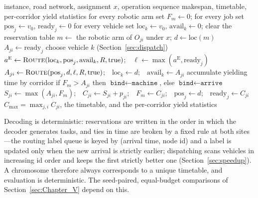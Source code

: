 \documentclass[manuscript,screen,review]{acmart}
\begin{document}
\begin{algorithm}[t]
\caption{\textsc{Decode}: fitness from a complete conflict-free simulation}
\label{alg:decode}
\small
\begin{algorithmic}[1]
\Require instance, road network, assignment $x$, operation sequence
\Ensure makespan, timetable, per-corridor yield statistics
\State for every robotic arm set $F_m\gets 0$; for every job set $\mathrm{pos}_j\gets v_0$,
       $\mathrm{ready}_j\gets 0$
\State for every vehicle set $\mathrm{loc}_k\gets v_0$, $\mathrm{avail}_k\gets 0$; clear the reservation table
  \State $m\gets$ the robotic arm of $O_{ji}$ under $x$; $d\gets \mathrm{loc}(m)$
     \State $A_{ji}\gets \mathrm{ready}_j$ 
  \Else
     \State choose vehicle $k$ (Section~\ref{sec:dispatch})
     \State $a^{\mathrm{E}}\gets\textsc{Route}(\mathrm{loc}_k,\mathrm{pos}_j,
            \mathrm{avail}_k,R,\text{true})$;\ \ $\ell\gets\max(a^{\mathrm{E}},
            \mathrm{ready}_j)$ 
     \State $A_{ji}\gets\textsc{Route}(\mathrm{pos}_j,d,\ell,R,\text{true})$;\ \
            $\mathrm{loc}_k\gets d$;\ \ $\mathrm{avail}_k\gets A_{ji}$
     \State accumulate yielding time by corridor
  \EndIf
  \State if $F_m>A_{ji}$ then $\texttt{bind}\gets\texttt{machine}$, else
         $\texttt{bind}\gets\texttt{arrive}$ 
  \State $S_{ji}\gets\max(A_{ji},F_m)$;\ \ $C_{ji}\gets S_{ji}+p_{ji}$;\ \
         $F_m\gets C_{ji}$;\ \ $\mathrm{pos}_j\gets d$;\ \
         $\mathrm{ready}_j\gets C_{ji}$
\EndFor
\State \Return $C_{\max}=\max_{j,i} C_{ji}$, the timetable, and the per-corridor yield statistics
\end{algorithmic}
\end{algorithm}

Decoding is deterministic: reservations are written in the order in which the decoder generates tasks, and ties in time are broken by a fixed rule at both sites---the routing label queue is keyed by (arrival time, node id) and a label is updated only when the new arrival is strictly earlier;
dispatching scans vehicles in increasing id order and keeps the first strictly better one (Section~\ref{sec:speedup}).
A chromosome therefore always corresponds to a unique timetable, and evaluation is deterministic. The seed-paired, equal-budget comparisons of Section~\ref{sec:Chapter_V} depend on this.
\end{document}
